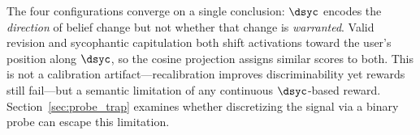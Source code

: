 The four configurations converge on a single conclusion: $\dsyc$ encodes the \emph{direction} of belief change but not whether that change is \emph{warranted}.
Valid revision and sycophantic capitulation both shift activations toward the user's position along $\dsyc$, so the cosine projection assigns similar scores to both.
This is not a calibration artifact---recalibration improves discriminability yet rewards still fail---but a semantic limitation of any continuous $\dsyc$-based reward.
Section~\ref{sec:probe_trap} examines whether discretizing the signal via a binary probe can escape this limitation.